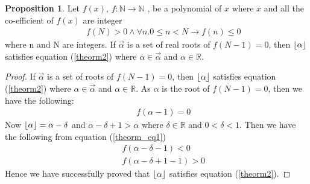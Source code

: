 \documentclass[12pt]{extarticle}
\DeclarePairedDelimiter\floor{\lfloor}{\rfloor}
\theoremstyle{definition}
\newtheorem{proposition}[theorem]{Proposition}
\begin{document}
\begin{proposition}\label{propos3}
Let $f(x)$, $f:\mathbb{N}\rightarrow \mathbb{N}$ , be a polynomial of $x$ where $x$ and all the co-efficient of $f(x)$ are integer 
\begin{eqnarray}
	&&f(N)>0 \land \forall n.0\leq n < N \rightarrow f(n)\leq0\label{theorm2}
\end{eqnarray}
where n and N are integers. If $\vec{\alpha}$ is a set of real roots of $f(N-1)=0$, then $\floor*{\alpha}$ satisfies equation (\ref{theorm2}) where $\alpha \in \vec{\alpha}$ and $\alpha \in \mathbb{R}$.
\end{proposition}
\begin{proof}
If $\vec{\alpha}$ is a set of roots of $f(N-1)=0$, then $\floor*{\alpha}$ satisfies equation (\ref{theorm2}) where $\alpha \in \vec{\alpha}$ and $\alpha \in \mathbb{R}$.
As $\alpha$ is the root of $f(N-1)=0$, then we have the following:
    \begin{eqnarray}
    &&f(\alpha-1)=0\label{theorm_eq4}
    \end{eqnarray}
Now $\floor*{\alpha}=\alpha-\delta$ and $\alpha-\delta+1>\alpha$ where $\delta \in \mathbb{R}$ and $0<\delta<1$. Then we have the following from equation (\ref{theorm_eq1})
    \begin{eqnarray}
    &&f(\alpha-\delta-1)<0\label{theorm_eq5}\\
    &&f(\alpha-\delta+1-1)>0\label{theorm_eq6}
    \end{eqnarray}
Hence we have successfully proved that $\floor*{\alpha}$ satisfies equation (\ref{theorm2}).
\end{proof}
\end{document}
